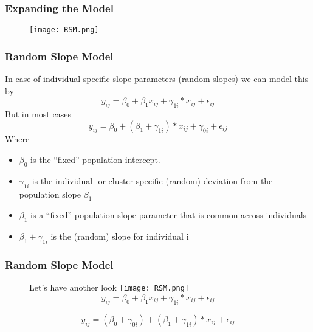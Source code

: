 \documentclass{beamer}
\begin{document}

\begin{frame}
\frametitle{Expanding the Model}
 \begin{figure}
	
	\texttt{[image: RSM.png]}

\end{figure}

\end{frame}

\begin{frame}
\frametitle{Random Slope Model}
In case of individual-specific slope parameters (random slopes) we can model this by
	\begin{equation}
y_{ij}=\beta_0+\beta_1x_{ij}+\gamma_{1i}*x_{ij}+\epsilon_{ij}
\end{equation}
But in most cases
	\begin{equation}
y_{ij}=\beta_0+(\beta_1+\gamma_{1i})*x_{ij}+\gamma_{0i}+\epsilon_{ij}
\end{equation}
Where
\begin{itemize}
	\item $\beta_0$ is the “fixed” population intercept.
	\item $\gamma_{1i}$ is the individual- or cluster-specific (random) deviation from the population slope $\beta_1$
	\item $\beta_1$ is a “fixed” population slope parameter that is common across
	individuals
	\item $\beta_1+\gamma_{1i}$ is the (random) slope for individual i 
\end{itemize}	
\end{frame}
\begin{frame}
\frametitle{Random Slope Model}
\begin{figure}
	Let's have another look
	\texttt{[image: RSM.png]}
	\begin{equation}
	y_{ij}=\beta_0+\beta_1x_{ij}+\gamma_{1i}*x_{ij}+\epsilon_{ij}
	\end{equation}

	\begin{equation}
	y_{ij}=(\beta_0+\gamma_{0i})+(\beta_1+\gamma_{1i})*x_{ij}+\epsilon_{ij}
	\end{equation}
\end{figure}

\end{frame}
\end{document}
